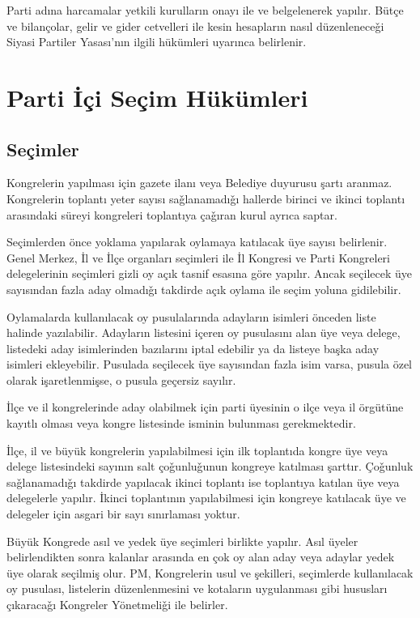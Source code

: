 \documentclass[11pt]{article} %
\begin{document}
Parti adına harcamalar yetkili kurulların onayı ile ve belgelenerek yapılır. Bütçe ve bilançolar, gelir ve gider cetvelleri ile kesin hesapların nasıl düzenleneceǧi Siyasi Partiler Yasası’nın ilgili hükümleri uyarınca belirlenir.

\section{Parti İçi Seçim Hükümleri}


\subsection{Seçimler}
Kongrelerin yapılması için gazete ilanı veya Belediye duyurusu şartı aranmaz. Kongrelerin toplantı yeter sayısı saǧlanamadıǧı hallerde birinci ve ikinci toplantı arasındaki süreyi kongreleri toplantıya çaǧıran kurul ayrıca saptar.

Seçimlerden önce yoklama yapılarak oylamaya katılacak üye sayısı belirlenir. Genel Merkez, İl ve İlçe organları seçimleri ile İl Kongresi ve Parti Kongreleri delegelerinin seçimleri gizli oy açık tasnif esasına göre yapılır. Ancak seçilecek üye sayısından fazla aday olmadıǧı takdirde açık oylama ile seçim yoluna gidilebilir.

Oylamalarda kullanılacak oy pusulalarında adayların isimleri önceden liste halinde yazılabilir. Adayların listesini içeren oy pusulasını alan üye veya delege, listedeki aday isimlerinden bazılarını iptal edebilir ya da listeye başka aday isimleri ekleyebilir. Pusulada seçilecek üye sayısından fazla isim varsa, pusula özel olarak işaretlenmişse, o pusula geçersiz sayılır.

İlçe ve il kongrelerinde aday olabilmek için parti üyesinin o ilçe veya il örgütüne kayıtlı olması veya kongre listesinde isminin bulunması gerekmektedir.

İlçe, il ve büyük kongrelerin yapılabilmesi için ilk toplantıda kongre üye veya delege listesindeki sayının salt çoǧunluǧunun kongreye katılması şarttır. Çoǧunluk saǧlanamadıǧı takdirde yapılacak ikinci toplantı ise toplantıya katılan üye veya delegelerle yapılır. İkinci toplantının yapılabilmesi için kongreye katılacak üye ve delegeler için asgari bir sayı sınırlaması yoktur.

Büyük Kongrede asıl ve yedek üye seçimleri birlikte yapılır. Asıl üyeler belirlendikten sonra kalanlar arasında en çok oy alan aday veya adaylar yedek üye olarak seçilmiş olur. PM, Kongrelerin usul ve şekilleri, seçimlerde kullanılacak oy pusulası, listelerin düzenlenmesini ve kotaların uygulanması gibi hususları çıkaracaǧı Kongreler Yönetmeliǧi ile belirler.
\end{document}
